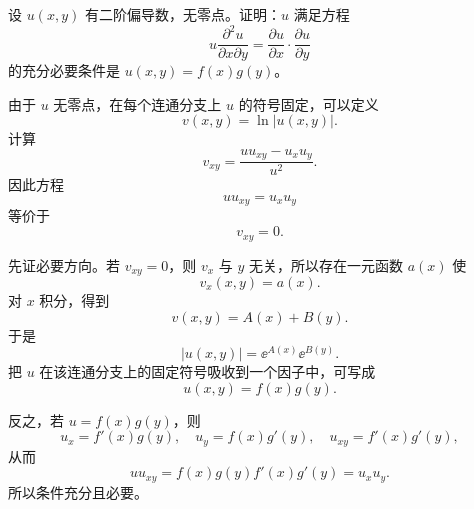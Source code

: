 \begin{xreferenceproblem}[3]
设 $u(x,y)$ 有二阶偏导数，无零点。证明：$u$ 满足方程
  \[
    u\frac{\partial^2u}{\partial x\partial y}
    =\frac{\partial u}{\partial x}\cdot\frac{\partial u}{\partial y}
  \]
  的充分必要条件是 $u(x,y)=f(x)g(y)$。
\end{xreferenceproblem}
\begin{xsolution}
由于 $u$ 无零点，在每个连通分支上 $u$ 的符号固定，可以定义
\[
  v(x,y)=\ln|u(x,y)|.
\]
计算
\[
  v_{xy}
  =\frac{u u_{xy}-u_xu_y}{u^2}.
\]
因此方程
\[
  uu_{xy}=u_xu_y
\]
等价于
\[
  v_{xy}=0.
\]

先证必要方向。若 $v_{xy}=0$，则 $v_x$ 与 $y$ 无关，所以存在一元函数 $a(x)$ 使
\[
  v_x(x,y)=a(x).
\]
对 $x$ 积分，得到
\[
  v(x,y)=A(x)+B(y).
\]
于是
\[
  |u(x,y)|=\ee^{A(x)}\ee^{B(y)}.
\]
把 $u$ 在该连通分支上的固定符号吸收到一个因子中，可写成
\[
  \boxed{u(x,y)=f(x)g(y)}.
\]

反之，若 $u=f(x)g(y)$，则
\[
  u_x=f'(x)g(y),
  \quad
  u_y=f(x)g'(y),
  \quad
  u_{xy}=f'(x)g'(y),
\]
从而
\[
  uu_{xy}
  =f(x)g(y)f'(x)g'(y)
  =u_xu_y.
\]
所以条件充分且必要。
\end{xsolution}


